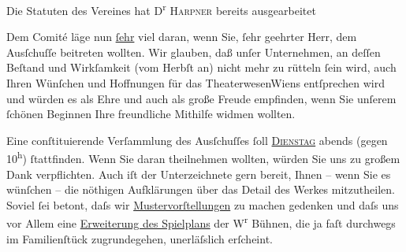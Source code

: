                   \pend\pstart\noindent{}
                  \pend\pstart\noindent{}
                  \pend\pstart\noindent{}
                  \pend
\pstart
           {\pb}Die Statuten des Vereines hat D\textsuperscript{r}{ }\textsc{Harpner} bereits ausgearbeitet\pend
           
\pstart
           Dem Comité läge nun \uline{ſehr} viel daran, wenn Sie,{ }ſehr
               geehrter Herr, dem Ausſchuſſe beitreten wollten. Wir glauben, daß unſer Unternehmen,
               an deſſen Beſtand und Wirkſamkeit (vom Herbſt an) nicht mehr zu rütteln{ }ſein wird, auch Ihren Wünſchen und Hoffnungen für das TheaterwesenWiens entſprechen wird und würden es als Ehre und
               auch als große Freude empfinden, wenn Sie unſerem{ }ſchönen Beginnen Ihre freundliche
               Mithilfe widmen wollten.\pend
           
\pstart
           Eine conſtituierende Verſammlung des Ausſchuſſes{ }ſoll \uline{\textsc{Dienstag}} abends (gegen 10\textsuperscript{h}){ }ſtattfinden. Wenn Sie daran
               theilnehmen wollten, würden Sie uns zu großem Dank verpflichten. Auch iſt der
               Unterzeichnete gern bereit, Ihnen {\pb}– wenn Sie
               es wünſchen – die nöthigen Aufklärungen über das Detail des Werkes mitzutheilen.
               Soviel{ }ſei betont, daſs wir \uline{Mustervorſtellungen} zu
               machen gedenken und daſs uns vor Allem eine \uline{Erweiterung
                  des Spielplans} der W\textsuperscript{r} Bühnen, die ja faſt durchwegs im Familienſtück zugrundegehen, unerläſslich
               erſcheint.\pend
           
